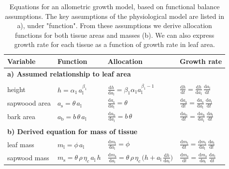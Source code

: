 \documentclass[10pt,twoside]{article}
\begin{document}
\begin{table}[h!]
\caption{Equations for an allometric growth model, based on functional balance assumptions. 
The key assumptions of the physiological model are listed in a), under "function". From these
assumptions we derive allocation functions for both tissue areas and masses (b). We can also 
express growth rate for each tissue as a function of growth rate in leaf area. }
\centering
  \begin{tabular}{p{2.5cm}p{3.5cm}p{5cm}p{4cm} }\\ \hline
  Variable & Function & Allocation & Growth rate\\ \hline
  \multicolumn{4}{l}{\textbf{a) Assumed relationship to leaf area}} \\ \\
  height &
    $h = \alpha_1 \, a_\textrm{l}^{\beta_1}$ &
    $\frac{\textrm{d}h}{\textrm{d}a_\textrm{l}} =  \beta_1 \alpha_1 a_\textrm{l}^{\beta_1-1}$ &
    $\frac{\textrm{d}h}{\textrm{d}t}  = \frac{\textrm{d}h}{\textrm{d}a_\textrm{l}} \, \frac{\textrm{d}a_\textrm{l}}{\textrm{d}t}$ \\
  sapwoood area &
    $a_\textrm{s} = \theta \, a_\textrm{l}$ &
    $\frac{\textrm{d}a_\textrm{s}}{\textrm{d} a_\textrm{l}} = \theta$ &
    $\frac{\textrm{d}a_\textrm{s}}{\textrm{d}t}  =\frac{\textrm{d}a_\textrm{s}}{\textrm{d} a_\textrm{l}} \, \frac{\textrm{d}a_\textrm{l}}{\textrm{d}t}$ \\
  bark area &
    $a_\textrm{b} = b \, \theta \, a_\textrm{l}$ &
    $\frac{\textrm{d}a_\textrm{b}}{\textrm{d} a_\textrm{l}} = b \, \theta$ &
    $\frac{\textrm{d}a_\textrm{b}}{\textrm{d}t} = \frac{\textrm{d}a_\textrm{b}}{\textrm{d} a_\textrm{l}} \, \frac{\textrm{d}a_\textrm{l}}{\textrm{d}t}$ \\  \\
  \multicolumn{4}{l}{\textbf{b) Derived equation for mass of tissue }} \\
  leaf mass &
    $m_\textrm{l} = \phi \, a_\textrm{l} $ &
    $\frac{\textrm{d}m_\textrm{l}}{\textrm{d}a_\textrm{l}} = \phi$ &
    $\frac{\textrm{d}m_\textrm{l}}{\textrm{d}t}  = \frac{\textrm{d}m_\textrm{l}}{\textrm{d}a_\textrm{l}}  \, \frac{\textrm{d}a_\textrm{l}}{\textrm{d}t}$ \\
  sapwood mass &
    $m_\textrm{s} = \theta \, \rho \, \eta_c \, a_\textrm{l} \, h $ &
    $\frac{\textrm{d}m_\textrm{s}}{\textrm{d}a_\textrm{l}} = \theta\, \rho\, \eta_c\, \big( h + a_\textrm{l}\, \frac{\textrm{d}h}{\textrm{d}a_\textrm{l}} \big)$ &
    $\frac{\textrm{d}m_\textrm{s}}{\textrm{d}t}  = \frac{\textrm{d}m_\textrm{s}}{\textrm{d}a_\textrm{l}} \, \frac{\textrm{d}a_\textrm{l}}{\textrm{d}t}$ \\

\end{tabular}
\end{table}
\end{document}

